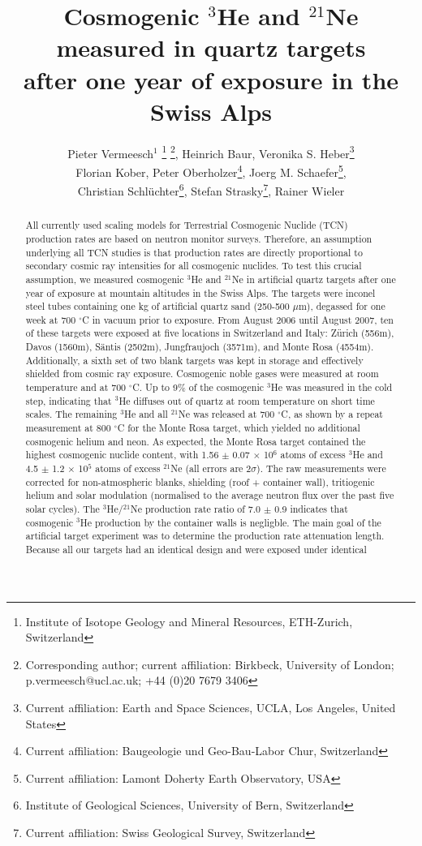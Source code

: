 \documentclass{article}
\title{Cosmogenic $^3$He and $^{21}$Ne measured in quartz
targets\\ after one year of exposure in the Swiss Alps}
\author{Pieter Vermeesch$^1$
\footnote{Institute of Isotope Geology and Mineral Resources, ETH-Zurich, Switzerland}
\footnote{Corresponding author; current affiliation:
Birkbeck, University of London; p.vermeesch@ucl.ac.uk; +44 (0)20 7679 3406}, 
Heinrich Baur\footnotemark[1],
Veronika S. Heber\footnotemark[1]
\footnote{Current affiliation: Earth and Space Sciences, UCLA, Los Angeles, United States}\\
Florian Kober\footnotemark[1],
Peter Oberholzer\footnotemark[1]
\footnote{Current affiliation: Baugeologie und Geo-Bau-Labor Chur, Switzerland}, 
Joerg M. Schaefer\footnotemark[1]
\footnote{Current affiliation: Lamont Doherty Earth Observatory, USA},\\
Christian Schl\"{u}chter\footnote{
Institute of Geological Sciences, University of Bern, Switzerland}, 
Stefan Strasky\footnotemark[1]
\footnote{Current affiliation: Swiss Geological Survey, Switzerland},
Rainer Wieler\footnotemark[1]\\
}
\begin{document}
\onehalfspace
\linenumbers
\maketitle
\begin{abstract}
  All currently used scaling models for Terrestrial Cosmogenic Nuclide
  (TCN)  production  rates  are  based  on  neutron  monitor  surveys.
  Therefore,  an  assumption  underlying   all  TCN  studies  is  that
  production rates  are directly proportional to  secondary cosmic ray
  intensities  for  all cosmogenic  nuclides.   To  test this  crucial
  assumption,   we  measured  cosmogenic   $^3$He  and   $^{21}$Ne  in
  artificial  quartz targets after  one year  of exposure  at mountain
  altitudes in the  Swiss Alps.  The targets were  inconel steel tubes
  containing  one  kg  of  artificial quartz  sand  (250-500  $\mu$m),
  degassed  for  one  week  at  700 $^{\circ}$C  in  vacuum  prior  to
  exposure.  From August 2006 until  August 2007, ten of these targets
  were exposed at five  locations in Switzerland and Italy: Z\"{u}rich
  (556m), Davos (1560m), S\"{a}ntis (2502m), Jungfraujoch (3571m), and
  Monte Rosa (4554m).  Additionally, a  sixth set of two blank targets
  was  kept  in  storage  and  effectively shielded  from  cosmic  ray
  exposure.  Cosmogenic noble gases  were measured at room temperature
  and  at 700 $^{\circ}$C.   Up to  9\% of  the cosmogenic  $^3$He was
  measured in  the cold step,  indicating that $^3$He diffuses  out of
  quartz  at room  temperature on  short time  scales.   The remaining
  $^3$He and all  $^{21}$Ne was released at 700  $^{\circ}$C, as shown
  by  a repeat  measurement  at  800 $^{\circ}$C  for  the Monte  Rosa
  target, which yielded no  additional cosmogenic helium and neon.  As
  expected,  the Monte  Rosa target  contained the  highest cosmogenic
  nuclide  content, with  1.56  $\pm$ 0.07  $\times$  10$^6$ atoms  of
  excess  $^3$He and  4.5 $\pm$  1.2 $\times$  10$^5$ atoms  of excess
  $^{21}$Ne  (all errors  are 2$\sigma$).   The raw  measurements were
  corrected  for non-atmospheric blanks,  shielding (roof  + container
  wall), tritiogenic  helium and  solar modulation (normalised  to the
  average  neutron  flux  over  the  past  five  solar  cycles).   The
  $^{3}$He/$^{21}$Ne production rate ratio  of 7.0 $\pm$ 0.9 indicates
  that  cosmogenic  $^{3}$He  production  by the  container  walls  is
  negligble.  The main goal of the artificial target experiment was to
  determine the  production rate attenuation length.   Because all our
  targets  had an identical  design and  were exposed  under identical

\end{abstract}
\end{document}
